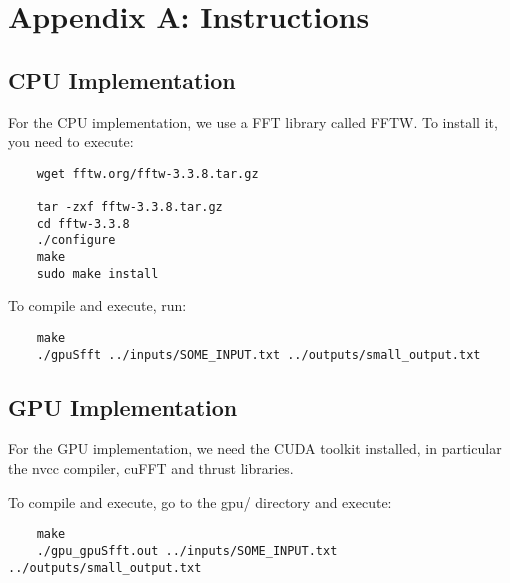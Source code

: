 \section{Appendix A: Instructions}

\subsection{CPU Implementation}
For the CPU implementation, we use a FFT library called FFTW. To install it, you need to execute:

\begin{verbatim}
    wget fftw.org/fftw-3.3.8.tar.gz
    
    tar -zxf fftw-3.3.8.tar.gz
    cd fftw-3.3.8
    ./configure
    make
    sudo make install
\end{verbatim}

To compile and execute, run:
\begin{verbatim}
    make
    ./gpuSfft ../inputs/SOME_INPUT.txt ../outputs/small_output.txt 
\end{verbatim}


\subsection{GPU Implementation}

For the GPU implementation, we need the CUDA toolkit installed, in particular the nvcc compiler, cuFFT and thrust libraries.

To compile and execute, go to the gpu/ directory and execute:

\begin{verbatim}
    make
    ./gpu_gpuSfft.out ../inputs/SOME_INPUT.txt ../outputs/small_output.txt 
\end{verbatim}
